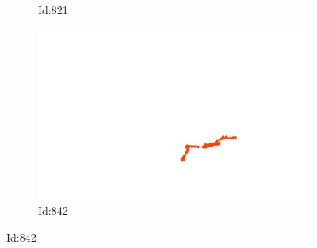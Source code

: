\documentclass[12pt,twoside]{report}
\begin{document}
\begin{figure}
\begin{subfigure}[b]{0.20\textwidth}
\caption{Id:821}
\end{subfigure}
\begin{subfigure}[b]{0.20\textwidth}
\centering
\includegraphics[width=\textwidth]{../../trajectories/842.png}
\caption{Id:842}
\end{subfigure}
\end{figure}
\end{document}
